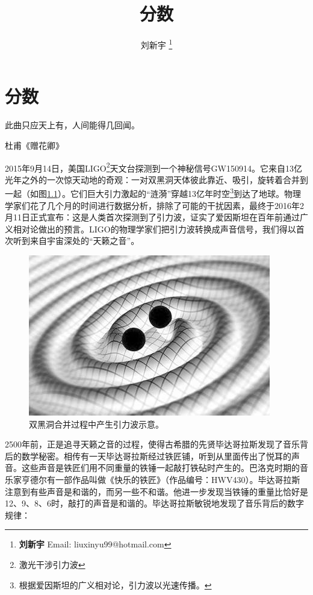 \documentclass[b5paper]{ctexart}
\begin{document}
\title{分数}

\author{刘新宇
\thanks{{\bfseries 刘新宇} \newline
  Email: liuxinyu99@hotmail.com \newline}
  }

\maketitle
\fi


\ifx\wholebook\relax
\chapter{分数}
\fi

\epigraph{此曲只应天上有，人间能得几回闻。}{杜甫《赠花卿》}

2015年9月14日，美国LIGO\footnote{激光干涉引力波}天文台探测到一个神秘信号GW150914。它来自13亿光年之外的一次惊天动地的奇观：一对双黑洞天体彼此靠近、吸引，旋转着合并到一起（如图\ref{fig:gravitational-wave}）。它们巨大引力激起的“涟漪”穿越13亿年时空\footnote{根据爱因斯坦的广义相对论，引力波以光速传播。}到达了地球。物理学家们花了几个月的时间进行数据分析，排除了可能的干扰因素，最终于2016年2月11日正式宣布：这是人类首次探测到了引力波，证实了爱因斯坦在百年前通过广义相对论做出的预言。LIGO的物理学家们把引力波转换成声音信号，我们得以首次听到来自宇宙深处的“天籁之音”。

\begin{figure}[htbp]
 \centering
 \includegraphics[scale=0.35]{img/gravitational-wave}
 \caption{双黑洞合并过程中产生引力波示意。}
 \label{fig:gravitational-wave}
\end{figure}

2500年前，正是追寻天籁之音的过程，使得古希腊的先贤毕达哥拉斯发现了音乐背后的数学秘密。相传有一天毕达哥拉斯经过铁匠铺，听到从里面传出了悦耳的声音。这些声音是铁匠们用不同重量的铁锤一起敲打铁砧时产生的。巴洛克时期的音乐家亨德尔有一部作品叫做《快乐的铁匠》（作品编号：HWV430）。毕达哥拉斯注意到有些声音是和谐的，而另一些不和谐。他进一步发现当铁锤的重量比恰好是12、9、8、6时，敲打的声音是和谐的。毕达哥拉斯敏锐地发现了音乐背后的数字规律：
\end{document}

